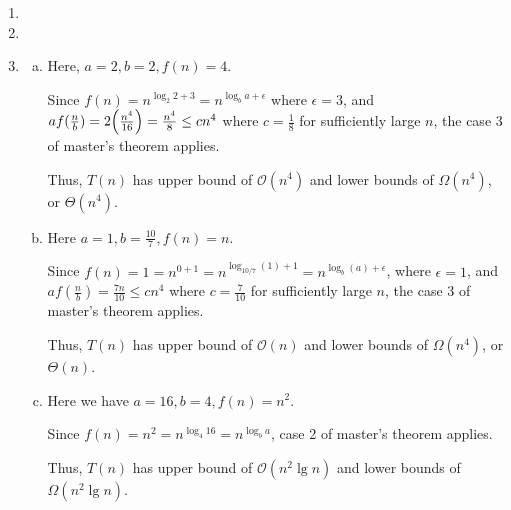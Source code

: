 \documentclass[12pt]{article}
\begin{document}
\begin{enumerate}[1.]
    \item

    \item

    \item

    \begin{enumerate}[a)]
        \item

        Here, $a = 2, b = 2, f(n) = 4$.

        \bigskip

        Since $f(n) = n^{\log_2 2 + 3} = n^{\log_b a + \epsilon}$ where $\epsilon = 3$,
        and $af(\frac{n}{b}) = 2\Bigl( \frac{n^4}{16} \Bigr) = \frac{n^4}{8} \leq cn^4$ where
        $c = \frac{1}{8}$ for sufficiently large $n$, the case 3 of master's theorem applies.

        \bigskip

        Thus, $T(n)$ has upper bound of $\mathcal{O}(n^4)$ and lower bounds of $\Omega(n^4)$, or $\Theta(n^4)$.

        \bigskip

        \item

        Here $a = 1, b = \frac{10}{7}, f(n) = n$.

        \bigskip

        Since $f(n) = 1 = n^{0 + 1} = n^{\log_{10/7} (1) + 1}=n^{\log_b (a) + \epsilon}$, where $\epsilon = 1$,
        and $af(\frac{n}{b}) =\frac{7n}{10} \leq cn^4$ where
        $c = \frac{7}{10}$ for sufficiently large $n$, the case 3 of master's theorem applies.

        \bigskip

        Thus, $T(n)$ has upper bound of $\mathcal{O}(n)$ and lower bounds of $\Omega(n^4)$, or $\Theta(n)$.

        \bigskip

        \item

        Here we have $a = 16, b = 4, f(n) = n^2$.

        \bigskip

        Since $f(n) = n^2 = n^{\log_4 16} = n^{\log_b a}$, case 2 of master's theorem applies.

        \bigskip

        Thus, $T(n)$ has upper bound of $\mathcal{O}(n^2 \lg n)$ and lower bounds of $\Omega(n^2 \lg n)$.

        \bigskip


\end{enumerate}
\end{enumerate}
\end{document}
